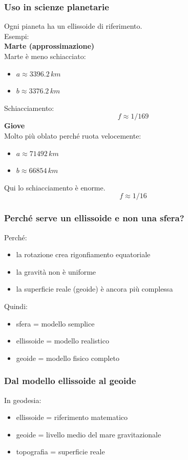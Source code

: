 \documentclass[a4paper,14pt]{article}
\begin{document}
\subsubsection{Uso in scienze planetarie}
Ogni pianeta ha un ellissoide di riferimento.\\
Esempi:\\
\textbf{Marte (approssimazione)}\\
Marte è meno schiacciato:
\begin{itemize}
\item \(a\approx3396.2\, km\)
\item \(b\approx3376.2\, km\)
\end{itemize}
Schiacciamento:\\
\[ f\approx1/169 \]
\textbf{Giove}\\
Molto più oblato perché ruota velocemente:\\
\begin{itemize}
\item \(a\approx71492\, km\)
\item \(b\approx66854\, km\)
\end{itemize}
Qui lo schiacciamento è enorme.\\
\[ f\approx1/16 \]
\subsubsection{Perché serve un ellissoide e non una sfera?}
Perché:\\
\begin{itemize}
\item la rotazione crea rigonfiamento equatoriale
\item la gravità non è uniforme
\item la superficie reale (geoide) è ancora più complessa
\end{itemize}
Quindi:
\begin{itemize}
\item sfera = modello semplice
\item ellissoide = modello realistico
\item geoide = modello fisico completo
\end{itemize}
\subsubsection{Dal modello ellissoide al geoide}
In geodesia:
\begin{itemize}
\item ellissoide = riferimento matematico
\item geoide = livello medio del mare gravitazionale
\item topografia = superficie reale
\end{itemize}
\end{document}
